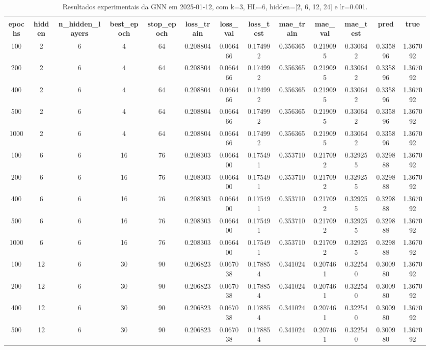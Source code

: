 \begin{table}[h]
\centering
\caption{Resultados experimentais da GNN em 2025-01-12, com k=3, HL=6, hidden=[2, 6, 12, 24] e lr=0.001.}
\label{tab:gnn_results_k3_hl6_d20250112}
\begin{tabular}{ccccccccccccc}
\toprule
epochs & hidden & n\_hidden\_layers & best\_epoch & stop\_epoch & loss\_train & loss\_val & loss\_test & mae\_train & mae\_val & mae\_test & pred & true \\
\midrule
100 & 2 & 6 & 4 & 64 & 0.208804 & 0.066466 & 0.174992 & 0.356365 & 0.219095 & 0.330642 & 0.335896 & 1.367092 \\
200 & 2 & 6 & 4 & 64 & 0.208804 & 0.066466 & 0.174992 & 0.356365 & 0.219095 & 0.330642 & 0.335896 & 1.367092 \\
400 & 2 & 6 & 4 & 64 & 0.208804 & 0.066466 & 0.174992 & 0.356365 & 0.219095 & 0.330642 & 0.335896 & 1.367092 \\
500 & 2 & 6 & 4 & 64 & 0.208804 & 0.066466 & 0.174992 & 0.356365 & 0.219095 & 0.330642 & 0.335896 & 1.367092 \\
1000 & 2 & 6 & 4 & 64 & 0.208804 & 0.066466 & 0.174992 & 0.356365 & 0.219095 & 0.330642 & 0.335896 & 1.367092 \\
100 & 6 & 6 & 16 & 76 & 0.208303 & 0.066400 & 0.175491 & 0.353710 & 0.217092 & 0.329255 & 0.329888 & 1.367092 \\
200 & 6 & 6 & 16 & 76 & 0.208303 & 0.066400 & 0.175491 & 0.353710 & 0.217092 & 0.329255 & 0.329888 & 1.367092 \\
400 & 6 & 6 & 16 & 76 & 0.208303 & 0.066400 & 0.175491 & 0.353710 & 0.217092 & 0.329255 & 0.329888 & 1.367092 \\
500 & 6 & 6 & 16 & 76 & 0.208303 & 0.066400 & 0.175491 & 0.353710 & 0.217092 & 0.329255 & 0.329888 & 1.367092 \\
1000 & 6 & 6 & 16 & 76 & 0.208303 & 0.066400 & 0.175491 & 0.353710 & 0.217092 & 0.329255 & 0.329888 & 1.367092 \\
100 & 12 & 6 & 30 & 90 & 0.206823 & 0.067038 & 0.178854 & 0.341024 & 0.207461 & 0.322540 & 0.300980 & 1.367092 \\
200 & 12 & 6 & 30 & 90 & 0.206823 & 0.067038 & 0.178854 & 0.341024 & 0.207461 & 0.322540 & 0.300980 & 1.367092 \\
400 & 12 & 6 & 30 & 90 & 0.206823 & 0.067038 & 0.178854 & 0.341024 & 0.207461 & 0.322540 & 0.300980 & 1.367092 \\
500 & 12 & 6 & 30 & 90 & 0.206823 & 0.067038 & 0.178854 & 0.341024 & 0.207461 & 0.322540 & 0.300980 & 1.367092 \\

\end{tabular}
\end{table}
